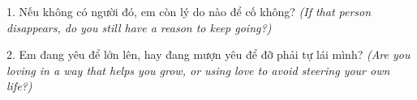 \begin{tuhocnhanh}
1. Nếu không có người đó, em còn lý do nào để cố không? \textit{(If that person disappears, do you still have a reason to keep going?)}

2. Em đang yêu để lớn lên, hay đang mượn yêu để đỡ phải tự lái mình? \textit{(Are you loving in a way that helps you grow, or using love to avoid steering your own life?)}
\end{tuhocnhanh}
\ngancach